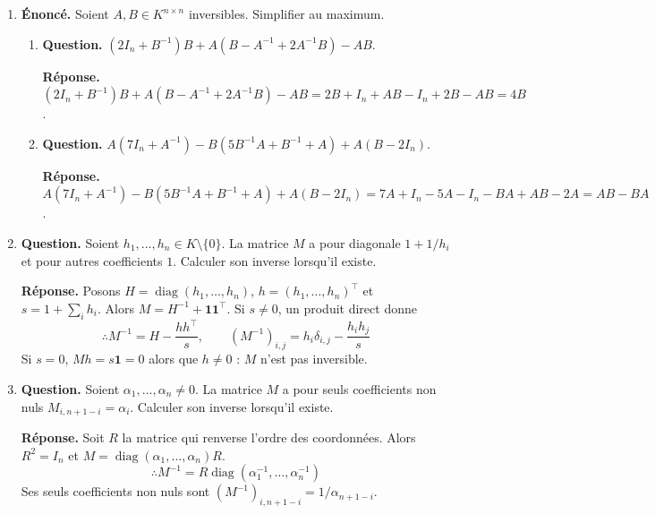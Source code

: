 \documentclass[12pt, a4paper]{article}
\begin{document}
\begin{enumerate}[label=4.\arabic*., start=60]
\begin{minipage}[t]{\linewidth}
\begin{enumerate}[\arabic*.]
\end{enumerate}
\end{minipage}

  \item \begin{minipage}[t]{\linewidth}\raggedright
\textbf{Énoncé.} Soient $A,B\in K^{n\times n}$ inversibles. Simplifier au maximum.

\begin{enumerate}[\arabic*.]
        \item \textbf{Question.} $(2I_n+B^{-1})B+A(B-A^{-1}+2A^{-1}B)-AB$.
\par\smallskip
\textbf{Réponse.} $(2I_n+B^{-1})B+A(B-A^{-1}+2A^{-1}B)-AB
        =2B+I_n+AB-I_n+2B-AB=4B$.

  \item \textbf{Question.} $A(7I_n+A^{-1})-B(5B^{-1}A+B^{-1}+A)+A(B-2I_n)$.
\par\smallskip
\textbf{Réponse.} $A(7I_n+A^{-1})-B(5B^{-1}A+B^{-1}+A)+A(B-2I_n)
        =7A+I_n-5A-I_n-BA+AB-2A=AB-BA$.

\end{enumerate}
\end{minipage}

  \item \begin{minipage}[t]{\linewidth}\raggedright
\textbf{Question.} Soient $h_1,\ldots,h_n\in K\setminus\{0\}$. La matrice $M$ a pour diagonale $1+1/h_i$ et pour autres coefficients $1$. Calculer son inverse lorsqu’il existe.
\par\smallskip
\textbf{Réponse.} Posons $H=\operatorname{diag}(h_1,\ldots,h_n)$, $h=(h_1,\ldots,h_n)^\top$ et $s=1+\sum_i h_i$.
    Alors $M=H^{-1}+\boldsymbol{1}\boldsymbol{1}^\top$.
    Si $s\neq0$, un produit direct donne
    \[
      \therefore M^{-1}=H-\frac{hh^\top}{s},\qquad
      (M^{-1})_{i,j}=h_i\delta_{i,j}-\frac{h_ih_j}{s}
    \]
    Si $s=0$, $Mh=s\boldsymbol{1}=0$ alors que $h\neq0$ : $M$ n'est pas inversible.
\end{minipage}

  \item \begin{minipage}[t]{\linewidth}\raggedright
\textbf{Question.} Soient $\alpha_1,\ldots,\alpha_n\neq0$. La matrice $M$ a pour seuls coefficients non nuls $M_{i,n+1-i}=\alpha_i$. Calculer son inverse lorsqu’il existe.
\par\smallskip
\textbf{Réponse.} Soit $R$ la matrice qui renverse l'ordre des coordonnées. Alors $R^2=I_n$ et
    $M=\operatorname{diag}(\alpha_1,\ldots,\alpha_n)R$.
    \[
      \therefore M^{-1}=R\operatorname{diag}(\alpha_1^{-1},\ldots,\alpha_n^{-1})
    \]
    Ses seuls coefficients non nuls sont $(M^{-1})_{i,n+1-i}=1/\alpha_{n+1-i}$.
\end{minipage}


\end{enumerate}
\end{document}
